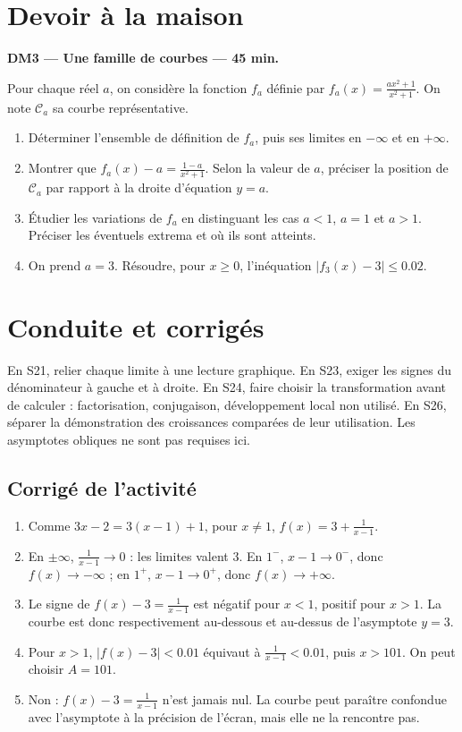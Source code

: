 \mxnewpage
\section{Devoir à la maison}\textbf{DM3 --- Une famille de courbes --- 45 min.}\par Pour chaque réel $a$, on considère la fonction $f_a$ définie par $f_a(x)=\frac{ax^2+1}{x^2+1}$. On note $\mathcal C_a$ sa courbe représentative.
\begin{enumerate}\item Déterminer l'ensemble de définition de $f_a$, puis ses limites en $-\infty$ et en $+\infty$.
\item Montrer que $f_a(x)-a=\frac{1-a}{x^2+1}$. Selon la valeur de $a$, préciser la position de $\mathcal C_a$ par rapport à la droite d'équation $y=a$.
\item Étudier les variations de $f_a$ en distinguant les cas $a<1$, $a=1$ et $a>1$. Préciser les éventuels extrema et où ils sont atteints.
\item On prend $a=3$. Résoudre, pour $x\ge0$, l'inéquation $|f_3(x)-3|\le\num{0,02}$.\end{enumerate}

\ifmxteacher\mxnewpage\section{Conduite et corrigés}\begin{teachernote}En S21, relier chaque limite à une lecture graphique. En S23, exiger les signes du dénominateur à gauche et à droite. En S24, faire choisir la transformation avant de calculer : factorisation, conjugaison, développement local non utilisé. En S26, séparer la démonstration des croissances comparées de leur utilisation. Les asymptotes obliques ne sont pas requises ici.\end{teachernote}

\subsection{Corrigé de l'activité}\begin{enumerate}
\item Comme $3x-2=3(x-1)+1$, pour $x\ne1$, $f(x)=3+\frac{1}{x-1}$.
\item En $\pm\infty$, $\frac{1}{x-1}\to0$ : les limites valent $3$. En $1^-$, $x-1\to0^-$, donc $f(x)\to-\infty$ ; en $1^+$, $x-1\to0^+$, donc $f(x)\to+\infty$.
\item Le signe de $f(x)-3=\frac{1}{x-1}$ est négatif pour $x<1$, positif pour $x>1$. La courbe est donc respectivement au-dessous et au-dessus de l'asymptote $y=3$.
\item Pour $x>1$, $|f(x)-3|<\num{0,01}$ équivaut à $\frac{1}{x-1}<\num{0,01}$, puis $x>101$. On peut choisir $A=101$.
\item Non : $f(x)-3=\frac{1}{x-1}$ n'est jamais nul. La courbe peut paraître confondue avec l'asymptote à la précision de l'écran, mais elle ne la rencontre pas.
\end{enumerate}

